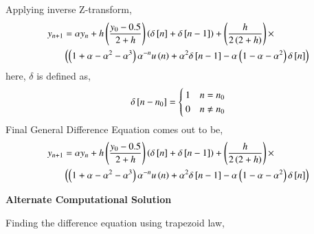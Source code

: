 \documentclass[journal]{IEEEtran}
\begin{document}
Applying inverse Z-transform,
\begin{align}
  y_{n+1} &= \alpha y_n + h\left( \frac{y_0 - 0.5}{2+h}\right)\left(\delta {}\left[n\right] + \delta {}\left[n-1\right]\right)+ \left(\frac{h}{2\left(2+h\right)}\right) \times \\
  &\left(\left(1 + \alpha - \alpha^2 - \alpha^3\right)\alpha^{-n} u \left(n\right) + \alpha^2 \delta {}\left[n-1\right]- \alpha \left(1 - \alpha - \alpha^2\right) \delta {}\left[n\right] \right)
\end{align}
here, $\delta$ is defined as,
\begin{align}
  \delta {}\left[n-n_0\right] = \begin{cases}
      1 & n = n_0 \\
      0 & n \ne n_0
  \end{cases}
\end{align}
Final General Difference Equation comes out to be, 
\begin{align}
  y_{n+1} &= \alpha y_n + h\left( \frac{y_0 - 0.5}{2+h}\right)\left(\delta {}\left[n\right] + \delta {}\left[n-1\right]\right)+ \left(\frac{h}{2\left(2+h\right)}\right) \times \\
  &\left(\left(1 + \alpha - \alpha^2 - \alpha^3\right)\alpha^{-n} u \left(n\right) + \alpha^2 \delta {}\left[n-1\right]- \alpha \left(1 - \alpha - \alpha^2\right) \delta {}\left[n\right] \right)
\end{align}

\textbf{Alternate Computational Solution}\newline

Finding the difference equation using trapezoid law,
\end{document}
